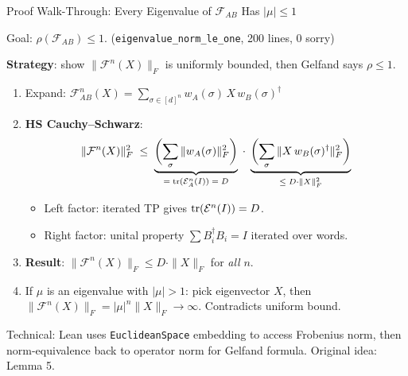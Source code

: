 \documentclass[aspectratio=169,10pt]{beamer}
\begin{document}
\begin{frame}{Proof Walk-Through: Every Eigenvalue of $\mathcal{F}_{AB}$ Has $|\mu| \leq 1$}
    \vspace{-0.5em}

    {\small\textcolor{dimwhite}{Goal: $\rho(\mathcal{F}_{AB}) \leq 1$.
    \quad(\texttt{eigenvalue\_norm\_le\_one}, 200 lines, 0 sorry)}}

    \vspace{0.3em}
    \textbf{Strategy}: show $\|\mathcal{F}^n(X)\|_F$ is uniformly bounded, then
    Gelfand says $\rho \leq 1$.

    \begin{enumerate}\itemsep0.12em\small
        \item Expand: $\mathcal{F}^n_{AB}(X) = \sum_{\sigma \in [d]^n}
            w_A(\sigma)\, X\, w_B(\sigma)^\dagger$

        \item \textbf{HS Cauchy--Schwarz}:
            \vspace{-0.3em}
            \[
                \|\mathcal{F}^n(X)\|_F^2
                \;\leq\;
                \underbrace{\biggl(\sum_\sigma \|w_A(\sigma)\|_F^2\biggr)}_{%
                    = \;\tr(\mathcal{E}_A^n(I))\;=\;D}
                \;\cdot\;
                \underbrace{\biggl(\sum_\sigma \|X\, w_B(\sigma)^\dagger\|_F^2\biggr)}_{%
                    \leq\; D \cdot \|X\|_F^2}
            \]
            \vspace{-0.6em}
            \begin{itemize}\footnotesize
                \item Left factor: iterated TP gives $\mathrm{tr}(\mathcal{E}^n(I)) = D$.
                \item Right factor: unital property
                    $\sum B_i^\dagger B_i = I$ iterated over words.
            \end{itemize}

        \item \textbf{Result}: $\|\mathcal{F}^n(X)\|_F \leq D \cdot \|X\|_F$
            for \emph{all} $n$.

        \item If $\mu$ is an eigenvalue with $|\mu| > 1$: pick eigenvector $X$,
            then $\|\mathcal{F}^n(X)\|_F = |\mu|^n\|X\|_F \to \infty$.
            Contradicts uniform bound.
    \end{enumerate}

    \vspace{0.2em}
    {\footnotesize\textcolor{dimwhite}{Technical: Lean uses \texttt{EuclideanSpace}
    embedding to access Frobenius norm, then norm-equivalence back to
    operator norm for Gelfand formula.
    Original idea: \cite{Perez-Garcia2007Matrix} Lemma 5.}}
\end{frame}
\end{document}

